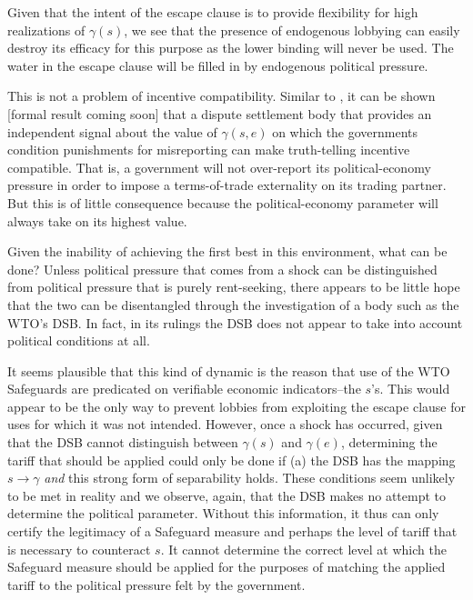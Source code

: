 \documentclass[12pt]{article}
\newcommand{\ga}{\gamma}
\begin{document}
Given that the intent of the escape clause is to provide flexibility for high realizations of $\ga(s)$, we see that the presence of endogenous lobbying can easily destroy its efficacy for this purpose as the lower binding will never be used. The water in the escape clause will be filled in by endogenous political pressure.

This is not a problem of incentive compatibility. Similar to \Textcite{beshkar2010b}, it can be shown [formal result coming soon] that a dispute settlement body that provides an independent signal about the value of $\ga(s,e)$ on which the governments condition punishments for misreporting can make truth-telling incentive compatible. That is, a government will not over-report its political-economy pressure in order to impose a terms-of-trade externality on its trading partner. But this is of little consequence because the political-economy parameter will always take on its highest value.

Given the inability of achieving the first best in this environment, what can be done? Unless political pressure that comes from a shock can be distinguished from political pressure that is purely rent-seeking, there appears to be little hope that the two can be disentangled through the investigation of a body such as the WTO's DSB. In fact, in its rulings the DSB does not appear to take into account political conditions at all.

It seems plausible that this kind of dynamic is the reason that use of the WTO Safeguards are predicated on verifiable economic indicators--the $s$'s. This would appear to be the only way to prevent lobbies from exploiting the escape clause for uses for which it was not intended. However, once a shock has occurred, given that the DSB cannot distinguish between $\ga(s)$ and $\ga(e)$, determining the tariff that should be applied could only be done if (a) the DSB has the mapping $s \rightarrow \ga$ \textit{and} this strong form of separability holds. These conditions seem unlikely to be met in reality and we observe, again, that the DSB makes no attempt to determine the political parameter. Without this information, it thus can only certify the legitimacy of a Safeguard measure and perhaps the level of tariff that is necessary to counteract $s$. It cannot determine the correct level at which the Safeguard measure should be applied for the purposes of matching the applied tariff to the political pressure felt by the government.
\end{document}
